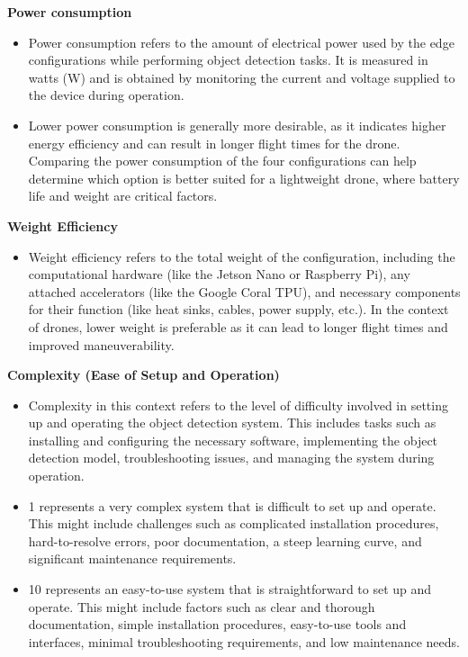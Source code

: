 \textbf{Power consumption}
\begin{itemize}
 \item Power consumption refers to the amount of electrical power used by the edge configurations while performing object detection tasks. It is measured in watts (W) and is obtained by monitoring the current and voltage supplied to the device during operation.
\item Lower power consumption is generally more desirable, as it indicates higher energy efficiency and can result in longer flight times for the drone. Comparing the power consumption of the four configurations can help determine which option is better suited for a lightweight drone, where battery life and weight are critical factors.\\
\end{itemize}

\textbf{Weight Efficiency}
\begin{itemize}
    \item Weight efficiency refers to the total weight of the configuration, including the computational hardware (like the Jetson Nano or Raspberry Pi), any attached accelerators (like the Google Coral TPU), and necessary components for their function (like heat sinks, cables, power supply, etc.). In the context of drones, lower weight is preferable as it can lead to longer flight times and improved maneuverability. \\
\end{itemize}

\textbf{Complexity (Ease of Setup and Operation)}
\begin{itemize}
\item Complexity in this context refers to the level of difficulty involved in setting up and operating the object detection system. This includes tasks such as installing and configuring the necessary software, implementing the object detection model, troubleshooting issues, and managing the system during operation.
\item 1 represents a very complex system that is difficult to set up and operate. This might include challenges such as complicated installation procedures, hard-to-resolve errors, poor documentation, a steep learning curve, and significant maintenance requirements.
\item 10 represents an easy-to-use system that is straightforward to set up and operate. This might include factors such as clear and thorough documentation, simple installation procedures, easy-to-use tools and interfaces, minimal troubleshooting requirements, and low maintenance needs.\\
\end{itemize}

